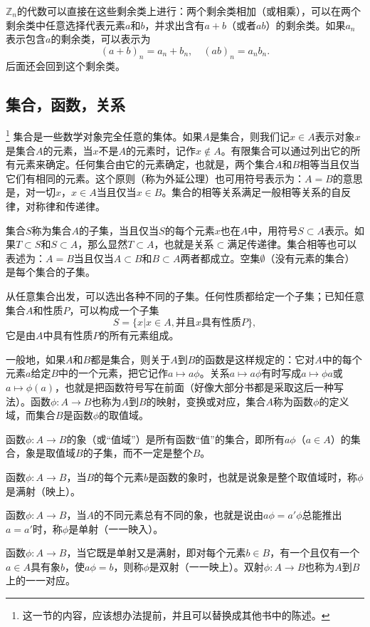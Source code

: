 $\mathbb{Z}_n$的代数可以直接在这些剩余类上进行：两个剩余类相加（或相乘），可以在两个剩余类中任意选择代表元素$a$和$b$，并求出含有$a+b$（或者$ab$）的剩余类。如果$a_n$表示包含$a$的剩余类，可以表示为
\[
(a+b)_n = a_n + b_n, \quad (ab)_n = a_nb_n.
\]
后面还会回到这个剩余类。


\subsection{集合，函数，关系}\label{subsection0010111}\footnote{这一节的内容，应该想办法提前，并且可以替换成其他书中的陈述。}
集合是一些数学对象完全任意的集体。如果$A$是集合，则我们记$x \in A$表示对象$x$是集合$A$的元素，当$x$不是$A$的元素时，记作$x \not\in A$。有限集合可以通过列出它的所有元素来确定。任何集合由它的元素确定，也就是，两个集合$A$和$B$相等当且仅当它们有相同的元素。这个原则（称为外延公理）也可用符号表示为：$A=B$的意思是，对一切$x$，$x \in A$当且仅当$x \in B$。集合的相等关系满足一般相等关系的自反律，对称律和传递律。

集合$S$称为集合$A$的子集，当且仅当$S$的每个元素$x$也在$A$中，用符号$S \subset A$表示。如果$T \subset S$和$S \subset A$，那么显然$T \subset A$，也就是关系$\subset$满足传递律。集合相等也可以表述为：$A=B$当且仅当$A \subset B$和$B \subset A$两者都成立。空集$\emptyset$（没有元素的集合）是每个集合的子集。

从任意集合出发，可以选出各种不同的子集。任何性质都给定一个子集；已知任意集合$A$和性质$P$，可以构成一个子集
\[
S = \{x | x \in A, \text{并且}x\text{具有性质}P\},
\]
它是由$A$中具有性质$P$的所有元素组成。

一般地，如果$A$和$B$都是集合，则关于$A$到$B$的函数是这样规定的：它对$A$中的每个元素$a$给定$B$中的一个元素，把它记作$a \mapsto a\phi$。关系$a \mapsto a\phi$有时写成$a \mapsto \phi{}a$或$a \mapsto \phi(a)$，也就是把函数符号写在前面（好像大部分书都是采取这后一种写法）。函数$\phi: A \to B$也称为$A$到$B$的映射，变换或对应，集合$A$称为函数$\phi$的定义域，而集合$B$是函数$\phi$的取值域。

函数$\phi: A \to B$的象（或“值域”）是所有函数“值”的集合，即所有$a\phi$（$a \in A$）的集合，象是取值域$B$的子集，而不一定是整个$B$。

函数$\phi:A \to B$，当$B$的每个元素$b$是函数的象时，也就是说象是整个取值域时，称$\phi$是满射（映上）。

函数$\phi:A \to B$，当$A$的不同元素总有不同的象，也就是说由$a\phi=a'\phi$总能推出$a=a'$时，称$\phi$是单射（一一映入）。

函数$\phi:A \to B$，当它既是单射又是满射，即对每个元素$b \in B$，有一个且仅有一个$a \in A$具有象$b$，使$a\phi = b$，则称$\phi$是双射（一一映上）。双射$\phi:A \to B$也称为$A$到$B$上的一一对应。

